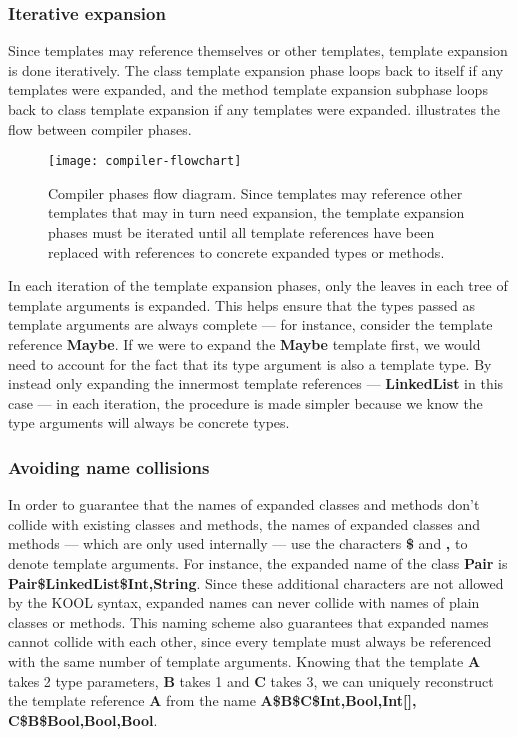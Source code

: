 \subsubsection{Iterative expansion}

Since templates may reference themselves or other templates, template expansion is done iteratively.
The class template expansion phase loops back to itself if any templates were expanded, and the
method template expansion subphase loops back to class template expansion if any templates were
expanded.  illustrates the flow between compiler phases.

\begin{figure}[hbtp]
  \texttt{[image: compiler-flowchart]}
  \caption{Compiler phases flow diagram. Since templates may reference other templates that may in
    turn need expansion, the template expansion phases must be iterated until all template
    references have been replaced with references to concrete expanded types or methods.}
  \label{fig:compiler-flowchart}
\end{figure}

In each iteration of the template expansion phases, only the leaves in each tree of template
arguments is expanded. This helps ensure that the types passed as template arguments are always
complete --- for instance, consider the template reference
\textbf{Maybe}. If we were to expand the \textbf{Maybe} template first,
we would need to account for the fact that its type argument is also a template type. By instead
only expanding the innermost template references --- \textbf{LinkedList} in this case ---
in each iteration, the procedure is made simpler because we know the type arguments will always be
concrete types.

\subsubsection{Avoiding name collisions}

In order to guarantee that the names of expanded classes and methods don't collide with existing
classes and methods, the names of expanded classes and methods --- which are only used internally
--- use the characters \textbf{\$} and \textbf{,} to denote template arguments. For instance, the
expanded name of the class \textbf{Pair} is
\textbf{Pair\$LinkedList\$Int,String}. Since these additional characters are not allowed by the KOOL
syntax, expanded names can never collide with names of plain classes or methods. This naming scheme
also guarantees that expanded names cannot collide with each other, since every template must always
be referenced with the same number of template arguments. Knowing that the template \textbf{A} takes
2 type parameters, \textbf{B} takes 1 and \textbf{C} takes 3, we can uniquely reconstruct the
template reference \textbf{A}
from the name \textbf{A\$B\$C\$Int,Bool,Int[], C\$B\$Bool,Bool,Bool}.



